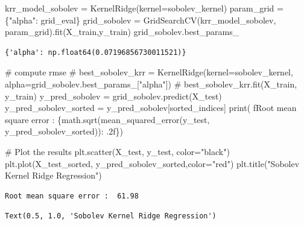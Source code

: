 \documentclass[
  letterpaper,
  DIV=11,
  numbers=noendperiod]{scrartcl}
\newenvironment{Shaded}{\begin{snugshade}}{\end{snugshade}}
\newcommand{\BuiltInTok}[1]{\textcolor[rgb]{0.00,0.23,0.31}{#1}}
\newcommand{\CommentTok}[1]{\textcolor[rgb]{0.37,0.37,0.37}{#1}}
\newcommand{\NormalTok}[1]{\textcolor[rgb]{0.00,0.23,0.31}{#1}}
\newcommand{\OperatorTok}[1]{\textcolor[rgb]{0.37,0.37,0.37}{#1}}
\newcommand{\SpecialCharTok}[1]{\textcolor[rgb]{0.37,0.37,0.37}{#1}}
\newcommand{\SpecialStringTok}[1]{\textcolor[rgb]{0.13,0.47,0.30}{#1}}
\newcommand{\StringTok}[1]{\textcolor[rgb]{0.13,0.47,0.30}{#1}}
\begin{document}
\begin{Shaded}
\begin{Highlighting}[]
\NormalTok{krr\_model\_sobolev }\OperatorTok{=}\NormalTok{ KernelRidge(kernel}\OperatorTok{=}\NormalTok{sobolev\_kernel)}
\NormalTok{param\_grid }\OperatorTok{=}\NormalTok{ \{}\StringTok{"alpha"}\NormalTok{: grid\_eval\}}
\NormalTok{grid\_sobolev }\OperatorTok{=}\NormalTok{ GridSearchCV(krr\_model\_sobolev, param\_grid).fit(X\_train,y\_train)}
\NormalTok{grid\_sobolev.best\_params\_}
\end{Highlighting}
\end{Shaded}

\begin{verbatim}
{'alpha': np.float64(0.07196856730011521)}
\end{verbatim}

\begin{Shaded}
\begin{Highlighting}[]
\CommentTok{\# compute rmse}
\CommentTok{\# best\_sobolev\_krr = KernelRidge(kernel=sobolev\_kernel, alpha=grid\_sobolev.best\_params\_["alpha"])}
\CommentTok{\# best\_sobolev\_krr.fit(X\_train, y\_train)}
\NormalTok{y\_pred\_sobolev }\OperatorTok{=}\NormalTok{ grid\_sobolev.predict(X\_test)}
\NormalTok{y\_pred\_sobolev\_sorted }\OperatorTok{=}\NormalTok{ y\_pred\_sobolev[sorted\_indices]}
\BuiltInTok{print}\NormalTok{( }\SpecialStringTok{f\textquotesingle{}Root mean square error : }\SpecialCharTok{\{}\NormalTok{math}\SpecialCharTok{.}\NormalTok{sqrt(mean\_squared\_error(y\_test, y\_pred\_sobolev\_sorted))}\SpecialCharTok{: .2f\}}\SpecialStringTok{\textquotesingle{}}\NormalTok{)}


\CommentTok{\# Plot the results}
\NormalTok{plt.scatter(X\_test, y\_test, color}\OperatorTok{=}\StringTok{"black"}\NormalTok{)}
\NormalTok{plt.plot(X\_test\_sorted, y\_pred\_sobolev\_sorted,color}\OperatorTok{=}\StringTok{"red"}\NormalTok{)}
\NormalTok{plt.title(}\StringTok{"Sobolev Kernel Ridge Regression"}\NormalTok{)}
\end{Highlighting}
\end{Shaded}

\begin{verbatim}
Root mean square error :  61.98
\end{verbatim}

\begin{verbatim}
Text(0.5, 1.0, 'Sobolev Kernel Ridge Regression')
\end{verbatim}
\end{document}
